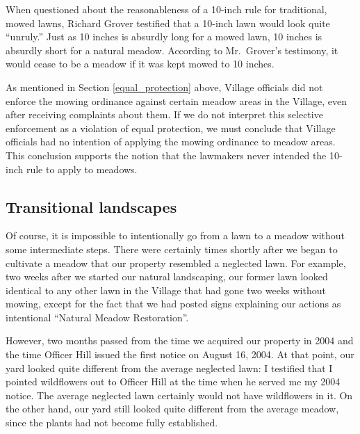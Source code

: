 \documentclass[12pt]{article}
\begin{document}
When questioned about the reasonableness of a 10-inch rule for traditional, mowed lawns, Richard Grover testified that a 10-inch lawn would look quite ``unruly.''
Just as 10 inches is absurdly long for a mowed lawn, 10 inches is absurdly short for a natural meadow.
According to Mr.\ Grover's testimony, it would cease to be a meadow if it was kept mowed to 10 inches.



As mentioned in Section \ref{equal_protection} above, Village officials did not enforce the mowing ordinance against certain meadow areas in the Village, even after receiving complaints about them.
If we do not interpret this selective enforcement as a violation of equal protection, we must conclude that Village officials had no intention of applying the mowing ordinance to meadow areas.
This conclusion supports the notion that the lawmakers never intended the 10-inch rule to apply to meadows.

\subsection{Transitional landscapes}

Of course, it is impossible to intentionally go from a lawn to a meadow without some intermediate steps.
There were certainly times shortly after we began to cultivate a meadow that our property resembled a neglected lawn.
For example, two weeks after we started our natural landscaping, our former lawn looked identical to any other lawn in the Village that had gone two weeks without mowing, except for the fact that we had posted signs explaining our actions as intentional ``Natural Meadow Restoration''.

However, two months passed from the time we acquired our property in 2004 and the time Officer Hill issued the first notice on August 16, 2004.
At that point, our yard looked quite different from the average neglected lawn:
I testified that I pointed wildflowers out to Officer Hill at the time when he served me my 2004 notice.
The average neglected lawn certainly would not have wildflowers in it.
On the other hand, our yard still looked quite different from the average meadow, since the plants had not become fully established.
\end{document}
